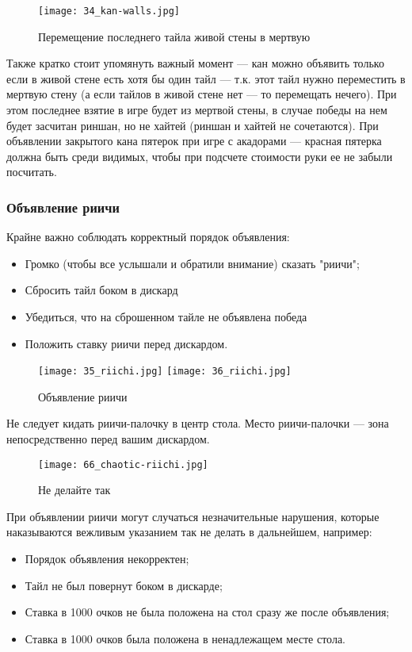 \begin{figure}[H]
	\centering
	\texttt{[image: 34\_kan-walls.jpg]}
	\caption{Перемещение последнего тайла живой стены в мертвую}
\end{figure}

Также кратко стоит упомянуть важный момент --- кан можно объявить только если в живой стене есть хотя бы один тайл --- т.к. этот тайл нужно переместить в мертвую стену (а если тайлов в живой стене нет --- то перемещать нечего). При этом последнее взятие в игре будет из мертвой стены, в случае победы на нем будет засчитан риншан, но не хайтей (риншан и хайтей не сочетаются). При объявлении закрытого кана пятерок при игре с акадорами --- красная пятерка должна быть среди видимых, чтобы при подсчете стоимости руки ее не забыли посчитать.

\subsubsection{Объявление риичи}

Крайне важно соблюдать корректный порядок объявления: 
\begin{itemize}
	\item Громко (чтобы все услышали и обратили внимание) сказать "риичи";
	\item Сбросить тайл боком в дискард
	\item Убедиться, что на сброшенном тайле не объявлена победа
	\item Положить ставку риичи перед дискардом.
\end{itemize}

\begin{figure}[H]
	\centering
	\texttt{[image: 35\_riichi.jpg]}
	\texttt{[image: 36\_riichi.jpg]}
	\caption{Объявление риичи}
\end{figure}

\newpage

Не следует кидать риичи-палочку в центр стола. Место риичи-палочки --- зона непосредственно перед вашим дискардом. 

\begin{figure}[H]
	\centering
	\texttt{[image: 66\_chaotic-riichi.jpg]}
	\caption{Не делайте так}
\end{figure}

При объявлении риичи могут случаться незначительные нарушения, которые наказываются вежливым указанием так не делать в дальнейшем, например:
\begin{itemize}
	\item Порядок объявления некорректен;
	\item Тайл не был повернут боком в дискарде;
	\item Ставка в 1000 очков не была положена на стол сразу же после объявления;
	\item Ставка в 1000 очков была положена в ненадлежащем месте стола.
\end{itemize}

